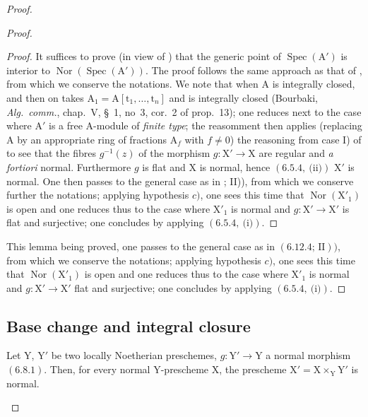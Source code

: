 \begin{proof}
\begin{proof}
\begin{proof}
It suffices to prove (in view of ) that the generic point of $\operatorname{Spec}(\mathrm{A}')$ is interior to
$\operatorname{Nor}(\operatorname{Spec}(\mathrm{A}'))$. The proof follows the same approach as that of , from which we conserve the notations.
We note that when $\mathrm{A}$ is integrally closed, and then on takes $\mathrm{A}_1=\mathrm{A}[\mathrm{t}_1,\ldots,\mathrm{t}_n]$
and is integrally closed (Bourbaki, \emph{Alg.~comm.}, chap.~V, \S~1, no~3, cor.~2 of prop.~13); one reduces next to the
case where $\mathrm{A}'$ is a free $\mathrm{A}$-module of \emph{finite type}; the reasomment then applies (replacing $\mathrm{A}$
by an appropriate ring of fractions $\mathrm{A}_f$ with $f\neq 0$) the reasoning from case I) of 
to see that the fibres $g^{-1}(z)$ of the morphism $g:\mathrm{X}'\to\mathrm{X}$ are regular and \emph{a fortiori} normal.
Furthermore $g$ is flat and $\mathrm{X}$ is normal, hence $(6.5.4,~\text{(ii)})$ $\mathrm{X}'$ is normal. One then passes
to the general case as in ; II)), from which we conserve further the
notations; applying hypothesis $c)$, one sees this time that $\operatorname{Nor}(\mathrm{X}'_1)$ is open and one reduces thus to the case
where $\mathrm{X}'_1$ is normal and $g:\mathrm{X}'\to\mathrm{X}'$ is flat and surjective; one concludes by applying $(6.5.4,~\text{(i)})$.
\end{proof}

This lemma being proved, one passes to the general case as in $(\text{6.12.4; II}))$, from which we conserve the
notations; applying hypothesis $c)$, one sees this time that $\operatorname{Nor}(\mathrm{X}'_1)$ is open and one reduces thus to the case
where $\mathrm{X}'_1$ is normal and $g:\mathrm{X}'\to\mathrm{X}'$ flat and surjective; one concludes by applying $(6.5.4,~\text{(i)})$.
\end{proof}

\subsection{Base change and integral closure}
\label{subsection:IV.6.14}

\begin{proposition}[6.14.1]
\label{IV.6.14.1}
Let $\mathrm{Y}$, $\mathrm{Y}'$ be two locally Noetherian preschemes, $g:\mathrm{Y}'\to\mathrm{Y}$
a normal morphism $(6.8.1)$. Then, for every normal $\mathrm{Y}$-prescheme $\mathrm{X}$, the prescheme $\mathrm{X}'=\mathrm{X}\times_\mathrm{Y}\mathrm{Y}'$
is normal.
\end{proposition}


\end{proof}
